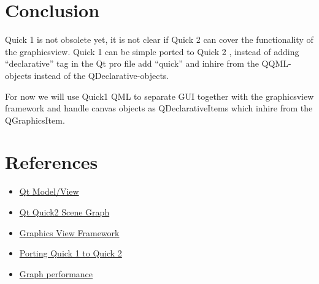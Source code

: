 \documentclass[a4paper,11pt,final]{article}
\begin{document}
\section{Conclusion}
Quick 1 is not obsolete yet, it is not clear if Quick 2 can cover the functionality of the graphicsview.
Quick 1 can be simple ported to Quick 2 , instead of adding ``declarative'' tag in the Qt pro file
add ``quick'' and inhire from the QQML-objects instead of the QDeclarative-objects.

For now we will use Quick1 QML to separate GUI together with the graphicsview framework and
handle canvas objects as QDeclarativeItems which inhire from the QGraphicsItem.


\section{References}
\begin{itemize}
	\item \href{http://doc.qt.io/qt-5/qtquick-modelviewsdata-modelview.html}{Qt Model/View}
	\item \href{http://doc.qt.io/qt-5/qtquick-visualcanvas-scenegraph.html}{Qt Quick2 Scene Graph}
	\item \href{http://doc.qt.io/qt-5/graphicsview.html}{Graphics View Framework}
	\item \href{http://doc.qt.io/qt-5/qtquick-porting-qt5.html}{Porting Quick 1 to Quick 2}
	\item \href{http://blog.qt.digia.com/blog/2013/09/02/new-scene-graph-renderer/}{Graph performance}
\end{itemize}
\end{document}
